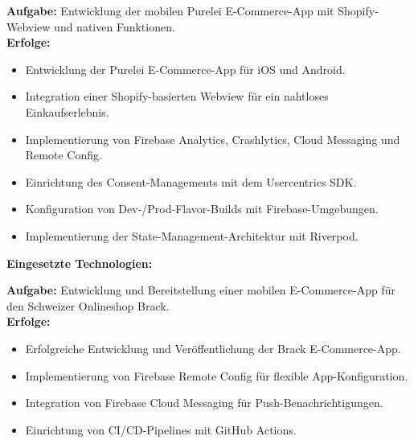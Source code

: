 \documentclass[10pt,a4paper,normalphoto]{altacv}
\begin{document}
\begin{fullwidth}
\textbf{Aufgabe:} Entwicklung der mobilen Purelei E-Commerce-App mit Shopify-Webview und nativen Funktionen.\\
\textbf{Erfolge:}
\begin{itemize}
    \item Entwicklung der Purelei E-Commerce-App für iOS und Android.
    \item Integration einer Shopify-basierten Webview für ein nahtloses Einkaufserlebnis.
    \item Implementierung von Firebase Analytics, Crashlytics, Cloud Messaging und Remote Config.
    \item Einrichtung des Consent-Managements mit dem Usercentrics SDK.
    \item Konfiguration von Dev-/Prod-Flavor-Builds mit Firebase-Umgebungen.
    \item Implementierung der State-Management-Architektur mit Riverpod.
\end{itemize}

\textbf{Eingesetzte Technologien:}\\[0.4em]

\vspace{2em}

\textbf{Aufgabe:} Entwicklung und Bereitstellung einer mobilen E-Commerce-App für den Schweizer Onlineshop Brack.\\
\textbf{Erfolge:}
\begin{itemize}
    \item Erfolgreiche Entwicklung und Veröffentlichung der Brack E-Commerce-App.
    \item Implementierung von Firebase Remote Config für flexible App-Konfiguration.
    \item Integration von Firebase Cloud Messaging für Push-Benachrichtigungen.
    \item Einrichtung von CI/CD-Pipelines mit GitHub Actions.
\end{itemize}


\end{fullwidth}
\end{document}

